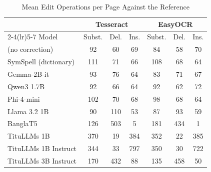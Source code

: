 \begin{table}[t]
\centering
\caption{Mean Edit Operations per Page Against the Reference}
\label{tab:editops}
\setlength{\tabcolsep}{6pt}
\footnotesize
\begin{tabular}{lcccccc}
\toprule
 & \multicolumn{3}{c}{Tesseract} & \multicolumn{3}{c}{EasyOCR} \\
\cmidrule(lr){2-4}\cmidrule(lr){5-7}
Model & Subst. & Del. & Ins. & Subst. & Del. & Ins. \\
\midrule
(no correction) & 92 & 60 & 69 & 84 & 58 & 70 \\
\midrule
SymSpell (dictionary) & 111 & 71 & 66 & 108 & 68 & 64 \\
Gemma-2B-it & 93 & 76 & 64 & 83 & 71 & 67 \\
Qwen3 1.7B & 92 & 66 & 64 & 92 & 62 & 72 \\
Phi-4-mini & 102 & 70 & 68 & 98 & 68 & 64 \\
Llama 3.2 1B & 90 & 110 & 53 & 87 & 93 & 59 \\
BanglaT5 & 126 & 503 & 5 & 181 & 434 & 1 \\
TituLLMs 1B & 370 & 19 & 384 & 352 & 22 & 385 \\
TituLLMs 1B Instruct & 344 & 33 & 797 & 350 & 30 & 722 \\
TituLLMs 3B Instruct & 170 & 432 & 88 & 135 & 458 & 50 \\
\bottomrule
\end{tabular}
\end{table}
